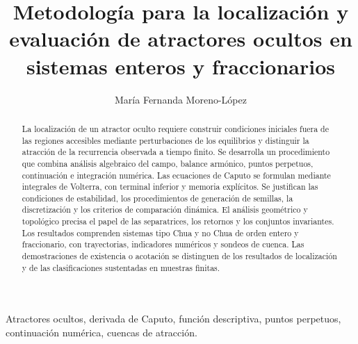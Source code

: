 \documentclass[journal,10pt,letterpaper]{IEEEtran}
\title{Metodología para la localización y evaluación de atractores ocultos en sistemas enteros y fraccionarios}
\author{María Fernanda Moreno-López}
\date{}
\begin{document}
\maketitle
\begin{abstract}
La localización de un atractor oculto requiere construir condiciones iniciales
fuera de las regiones accesibles mediante perturbaciones de los equilibrios
y distinguir la atracción de la recurrencia observada a tiempo finito.
Se desarrolla un procedimiento que combina análisis algebraico del campo,
balance armónico, puntos perpetuos, continuación e integración numérica.
Las ecuaciones de Caputo se formulan mediante integrales de Volterra, con
terminal inferior y memoria explícitos. Se justifican las condiciones de
estabilidad, los procedimientos de generación de semillas, la discretización
y los criterios de comparación dinámica. El análisis geométrico y topológico
precisa el papel de las separatrices, los retornos y los conjuntos invariantes.
Los resultados comprenden sistemas tipo Chua y no Chua de orden entero y
fraccionario, con trayectorias, indicadores numéricos y sondeos de cuenca.
Las demostraciones de existencia o acotación se distinguen de los resultados
de localización y de las clasificaciones sustentadas en muestras finitas.
\end{abstract}
\begin{IEEEkeywords}
Atractores ocultos, derivada de Caputo, función descriptiva, puntos perpetuos,
continuación numérica, cuencas de atracción.
\end{IEEEkeywords}







\FloatBarrier

\clearpage


\end{document}
